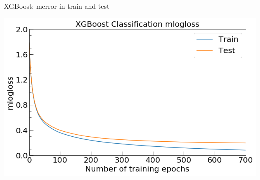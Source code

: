 \documentclass{if-beamer}
\begin{document}
  
\begin{frame}{XGBoost: merror in train and test}    
 
   \centering \includegraphics[scale=0.5]{./figs/xgb_epoch.png}
   
  \end{frame}


  
\end{document}
